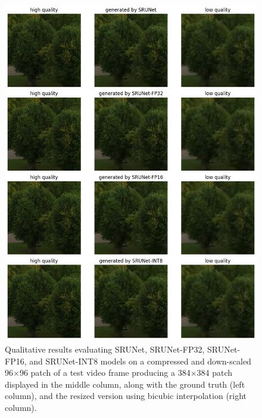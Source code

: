 \begin{figure}[ht]
\includegraphics[width=1.0\textwidth]{static/03_srunet_qualitative_results.png}
\caption{Qualitative results evaluating SRUNet, SRUNet-FP32, SRUNet-FP16, and SRUNet-INT8 models on a compressed and down-scaled 96$\times$96 patch of a test video frame producing a 384$\times$384 patch displayed in the middle column, along with the ground truth (left column), and the resized version using bicubic interpolation (right column).}
\label{fig:trees-qualitative-srunet}
\end{figure}


